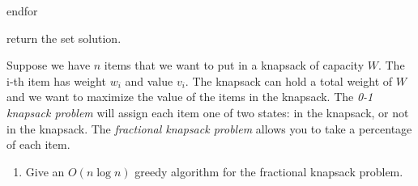 \documentclass{article}
\begin{document}
endfor

return the set solution.




\nextprob
Suppose we have $n$ items that we want to put in a knapsack of capacity $W$.  The i-th item has
weight $w_i$ and value $v_i$.  The knapsack can hold a total weight of $W$ and
we want to maximize the value of the items in the knapsack.
The \emph{0-1 knapsack problem} will assign each item one of two states: in the
knapsack, or not in the knapsack.  The \emph{fractional knapsack problem} allows
you to take a percentage of each item.
\begin{enumerate}
    \item Give an $O(n\log n)$ greedy algorithm for the fractional knapsack problem.
    \newline\newline
    

\end{enumerate}
\end{document}
